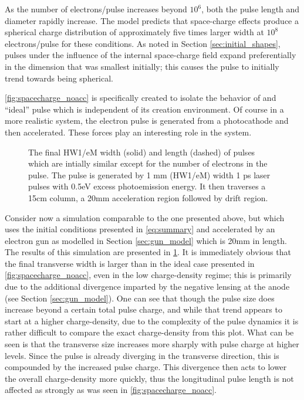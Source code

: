 
As the number of electrons/pulse increases beyond $10^6$, both the pulse length and diameter rapidly increase.
The model predicts that space-charge effects produce a spherical charge distribution of approximately five times larger width at $10^8$ electrons/pulse for these conditions.
As noted in Section \ref{sec:initial_shapes}, pulses under the influence of the internal space-charge field expand preferentially in the dimension that was smallest initially; this causes the pulse to initially trend towards being spherical.

\ref{fig:spacecharge_noacc} is specifically created to isolate the behavior of and ``ideal'' pulse which is independent of its creation environment.
Of course in a more realistic system, the electron pulse is generated from a photocathode and then accelerated.
These forces play an interesting role in the system.

\begin{figure}
  \centering
  \begin{tikzpicture}
    
  \end{tikzpicture}
  \caption[More realistic free-space pulse evolution vs charge density]{
    The final HW1/eM width (solid) and length (dashed) of pulses which are intially similar except for the number of electrons in the pulse.
    The pulse is generated by 1 mm (HW1/eM) width 1 ps laser pulses with 0.5eV excess photoemission energy.
    It then traverses a 15cm column, a 20mm acceleration region followed by drift region.
  }
  \label{fig:spacecharge_acc}
\end{figure}

Consider now a simulation comparable to the one presented above, but which uses the initial conditions presented in \ref{eq:summary} and accelerated by an electron gun as modelled in Section \ref{sec:gun_model} which is 20mm in length.
The results of this simulation are presented in \ref{fig:spacecharge_acc}.
It is immediately obvious that the final transverse width is larger than in the ideal case presented in \ref{fig:spacecharge_noacc}, even in the low charge-density regime; this is primarily due to the additional divergence imparted by the negative lensing at the anode (see Section \ref{sec:gun_model}).
One can see that though the pulse size does increase beyond a certain total pulse charge, and while that trend appears to start at a higher charge-density, due to the complexity of the pulse dynamics it is rather difficult to compare the exact charge-density from this plot.
What can be seen is that the transverse size increases more sharply with pulse charge at higher levels.
Since the pulse is already diverging in the transverse direction, this is compounded by the increased pulse charge.
This divergence then acts to lower the overall charge-density more quickly, thus the longitudinal pulse length is not affected as strongly as was seen in \ref{fig:spacecharge_noacc}.


